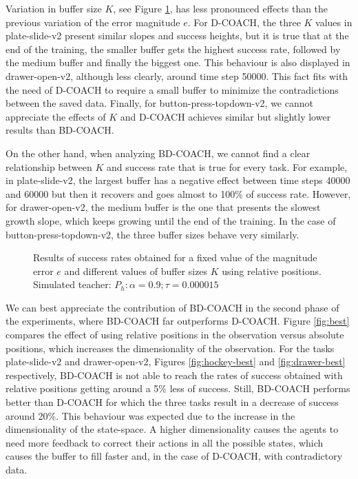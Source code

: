 Variation in buffer size $K$, see Figure \ref{fig:same-e}, has less pronounced effects than the previous variation of the error magnitude $e$. For D-COACH, the three $K$ values in plate-slide-v2 present similar slopes and success heights, but it is true that at the end of the training, the smaller buffer gets the highest success rate, followed by the medium buffer and finally the biggest one. This behaviour is also displayed in drawer-open-v2, although less clearly, around time step 50000. This fact fits with the need of D-COACH to require a small buffer to minimize the contradictions between the saved data. Finally, for button-press-topdown-v2, we cannot appreciate the effects of $K$ and D-COACH achieves similar but slightly lower results than BD-COACH.

On the other hand, when analyzing BD-COACH, we cannot find a clear relationship between $K$ and success rate that is true for every task. For example, in plate-slide-v2, the largest buffer has a negative effect between time steps 40000 and 60000 but then it recovers and goes almost to 100\% of success rate. However, for drawer-open-v2, the medium buffer is the one that presents the slowest growth slope, which keeps growing until the end of the training. In the case of button-press-topdown-v2, the three buffer sizes behave very similarly.

 \begin{figure}[H]
  \centering
{}
   \hfill
  \hfill
  \caption{Results of success rates obtained for a fixed value of the magnitude error $e$ and different values of buffer sizes $K$ using relative positions. Simulated teacher: $P_h: \alpha = 0.9; \tau =  0.000015$}
  \label{fig:same-e}
\end{figure}


We can best appreciate the contribution of BD-COACH in the second phase of the experiments, where BD-COACH far outperforms D-COACH. Figure \ref{fig:best} compares the effect of using relative positions in the observation versus absolute positions, which increases the dimensionality of the observation.
For the tasks plate-slide-v2 and drawer-open-v2, Figures \ref{fig:hockey-best} and \ref{fig:drawer-best} respectively, BD-COACH is not able to reach the rates of success obtained with relative positions getting around a 5\% less of success. Still, BD-COACH performs better than D-COACH for which the three tasks result in a decrease of success around 20\%. This behaviour was expected due to the increase in the dimensionality of the state-space. A higher dimensionality causes the agents to need more feedback to correct their actions in all the possible states, which causes the buffer to fill faster and, in the case of D-COACH, with contradictory data.



